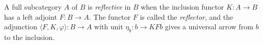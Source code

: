 A full subcategory $A$ of $B$ is \emph{reflective} in $B$ when the inclusion functor $K: A \to B$ has a left adjoint $F: B \to A$. The functor $F$ is called the \emph{reflector}, and the adjunction $\langle F, K, \varphi \rangle: B \to A$ with unit $\eta_b: b \to KFb$ gives a universal arrow from $b$ to the inclusion.
